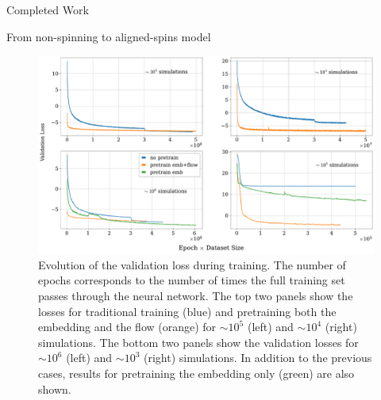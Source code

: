 \documentclass[a4paper, 12pt, twoside, openright, titlepage]{book}
\begin{document}
\begin{chapter}{Completed Work}
\begin{section}{From non-spinning to aligned-spins model}
\begin{figure}
\includegraphics[width=1.\columnwidth]{figures/val_loss.pdf}
\caption{Evolution of the validation loss during training. The number of epochs corresponds to the number of times the full training set passes through the neural network. The top two panels show the losses for traditional training (blue) and pretraining both the embedding and the flow (orange) for $\sim10^{5}$ (left) and $\sim10^{4}$ (right) simulations. The bottom two panels show the validation losses for  $\sim10^{6}$ (left) and $\sim10^{3}$ (right) simulations. In addition to the previous cases, results for pretraining the embedding only (green) are also shown.}
\label{loss}
\end{figure}


\end{section}
\end{chapter}
\end{document}
